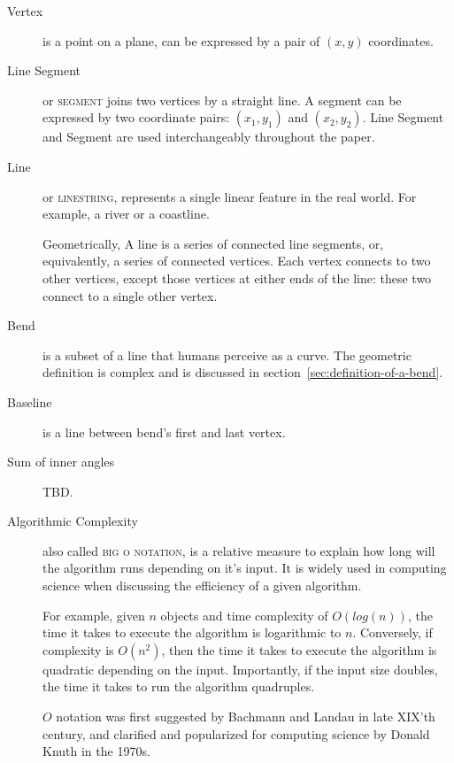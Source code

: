 \documentclass[a4paper]{article}
\begin{document}
\begin{description}

    \item[Vertex] is a point on a plane, can be expressed by a pair of $(x,y)$
        coordinates.

    \item[Line Segment] or \textsc{segment} joins two vertices by a straight
        line. A segment can be expressed by two coordinate pairs: $(x_1, y_1)$
        and $(x_2, y_2)$. Line Segment and Segment are used interchangeably
        throughout the paper.

    \item[Line] or \textsc{linestring}, represents a single linear feature in
        the real world. For example, a river or a coastline.

        Geometrically, A line is a series of connected line segments, or,
        equivalently, a series of connected vertices. Each vertex connects to
        two other vertices, except those vertices at either ends of the line:
        these two connect to a single other vertex.

    \item[Bend] is a subset of a line that humans perceive as a curve. The
        geometric definition is complex and is discussed in
        section~\ref{sec:definition-of-a-bend}.

    \item[Baseline] is a line between bend's first and last vertex.

    \item[Sum of inner angles] TBD.

    \item[Algorithmic Complexity] also called \textsc{big o notation}, is a
        relative measure to explain how long will the algorithm runs depending
        on it's input. It is widely used in computing science when discussing
        the efficiency of a given algorithm.

        For example, given $n$ objects and time complexity of $O(log(n))$, the
        time it takes to execute the algorithm is logarithmic to $n$.
        Conversely, if complexity is $O(n^2)$, then the time it takes to
        execute the algorithm is quadratic depending on the input. Importantly,
        if the input size doubles, the time it takes to run the algorithm
        quadruples.

        $O$ notation was first suggested by
        Bachmann\cite{bachmann1894analytische} and
        Landau\cite{landau1911} in late XIX'th century, and clarified
        and popularized for computing science by Donald
        Knuth\cite{knuth1976big} in the 1970s.

\end{description}
\end{document}
